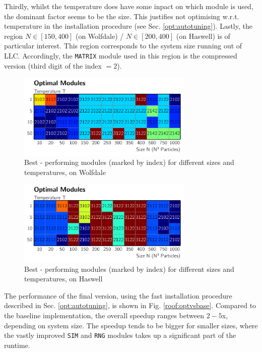 \documentclass[letterpaper]{article}
\begin{document}
Thirdly, whilst the temperature does have some inpact on which module is used, the dominant factor seems to be the size. This justifies not optimising w.r.t. temperature in the installation procedure (see Sec. \ref{opt:autotuning}).\newline
Lastly, the region $N \in [150,400]$ (on Wolfdale) / $N \in [200,400]$ (on Haswell) is of particular interest. This region corresponds to the system size running out of LLC. Accordingly, the \texttt{MATRIX} module used in this region is the compressed version (third digit of the index $=2$).
	\begin{figure}[h]\centering
	  \includegraphics[width = 8.36cm]{plots/module_msk2.pdf}
	  \caption{Best - performing modules (marked by index) for different sizes and temperatures, on Wolfdale}
	  \label{mod:Wolf}
	\end{figure}
	\begin{figure}[h]\centering
		  \includegraphics[width = 8.36cm]{plots/module_dg2.pdf}
		  \caption{Best - performing modules (marked by index) for different sizes and temperatures, on Haswell}
		  \label{mod,Has}
	\end{figure}\newline
The performance of the final version, using the fast installation procedure described in Sec. \ref{opt:autotuning}, is shown in Fig. \ref{roof:optvsbase}. Compared to the baseline implementation, the overall speedup ranges between $2 - 5$x, depending on system size. The speedup tends to be bigger for smaller sizes, where the vastly improved \texttt{SIM} and \texttt{RNG} modules takes up a significant part of the runtime. 
\end{document}
